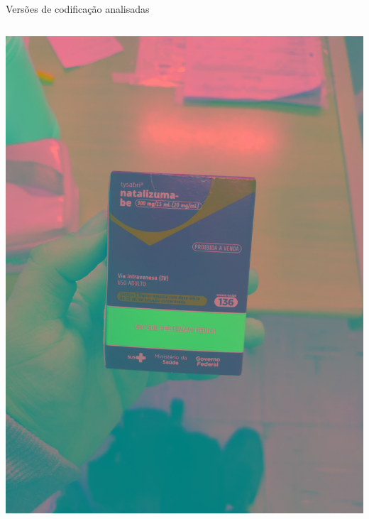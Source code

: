 \begin{frame}{Versões de codificação analisadas}
\begin{columns}
\begin{column}{0.45\textwidth}
\begin{columns}
\begin{column}{0.5\textwidth}
					\includegraphics[height=0.3\textheight]{../pictures/tysabri_YCrCb.jpg}
				\end{column}
			\end{columns}
		\end{column}
	\end{columns}
\end{frame}


